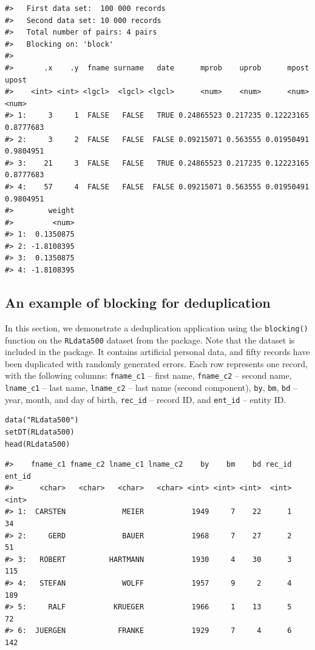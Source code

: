 \begin{verbatim}
#>   First data set:  100 000 records
#>   Second data set: 10 000 records
#>   Total number of pairs: 4 pairs
#>   Blocking on: 'block'
#> 
#>       .x    .y  fname surname   date      mprob    uprob      mpost     upost
#>    <int> <int> <lgcl>  <lgcl> <lgcl>      <num>    <num>      <num>     <num>
#> 1:     3     1  FALSE   FALSE   TRUE 0.24865523 0.217235 0.12223165 0.8777683
#> 2:     3     2  FALSE   FALSE  FALSE 0.09215071 0.563555 0.01950491 0.9804951
#> 3:    21     3  FALSE   FALSE   TRUE 0.24865523 0.217235 0.12223165 0.8777683
#> 4:    57     4  FALSE   FALSE  FALSE 0.09215071 0.563555 0.01950491 0.9804951
#>        weight
#>         <num>
#> 1:  0.1350875
#> 2: -1.8108395
#> 3:  0.1350875
#> 4: -1.8108395
\end{verbatim}

\subsection{An example of blocking for deduplication}\label{an-example-of-blocking-for-deduplication}

In this section, we demonstrate a deduplication application using the
\texttt{blocking()} function on the \texttt{RLdata500} dataset from the
 package. Note that the dataset is included in
the  package. It contains artificial personal data,
and fifty records have been duplicated with randomly generated errors.
Each row represents one record, with the following columns: \texttt{fname\_c1}
-- first name, \texttt{fname\_c2} -- second name, \texttt{lname\_c1} -- last name,
\texttt{lname\_c2} -- last name (second component), \texttt{by}, \texttt{bm}, \texttt{bd} -- year,
month, and day of birth, \texttt{rec\_id} -- record ID, and \texttt{ent\_id} -- entity
ID.


\begin{verbatim}
data("RLdata500")
setDT(RLdata500)
head(RLdata500)
\end{verbatim}

\begin{verbatim}
#>    fname_c1 fname_c2 lname_c1 lname_c2    by    bm    bd rec_id ent_id
#>      <char>   <char>   <char>   <char> <int> <int> <int>  <int>  <int>
#> 1:  CARSTEN             MEIER           1949     7    22      1     34
#> 2:     GERD             BAUER           1968     7    27      2     51
#> 3:   ROBERT          HARTMANN           1930     4    30      3    115
#> 4:   STEFAN             WOLFF           1957     9     2      4    189
#> 5:     RALF           KRUEGER           1966     1    13      5     72
#> 6:  JUERGEN            FRANKE           1929     7     4      6    142
\end{verbatim}

